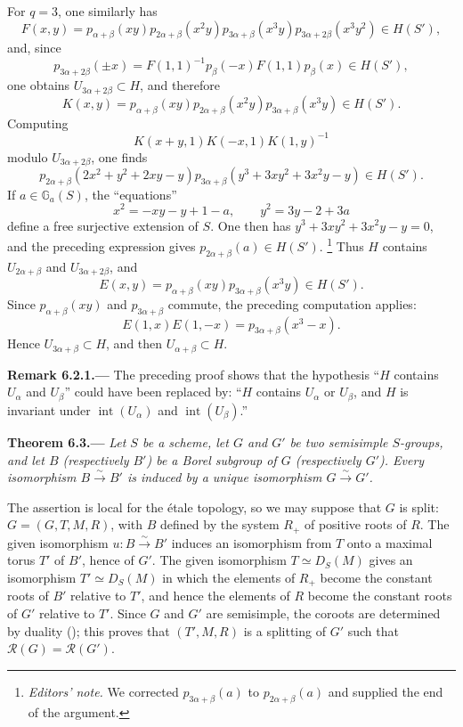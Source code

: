 For \(q=3\), one similarly has
\[
 F(x,y)=
 p_{\alpha+\beta}(xy)
 p_{2\alpha+\beta}(x^2y)
 p_{3\alpha+\beta}(x^3y)
 p_{3\alpha+2\beta}(x^3y^2)\in H(S'),
\]
and, since
\[
 p_{3\alpha+2\beta}(\pm x)
 =F(1,1)^{-1}p_\beta(-x)F(1,1)p_\beta(x)\in H(S'),
\]
one obtains \(U_{3\alpha+2\beta}\subset H\), and therefore
\[
 K(x,y)=
 p_{\alpha+\beta}(xy)
 p_{2\alpha+\beta}(x^2y)
 p_{3\alpha+\beta}(x^3y)\in H(S').
\]
Computing
\[
 K(x+y,1)K(-x,1)K(1,y)^{-1}
\]
modulo \(U_{3\alpha+2\beta}\), one finds
\[
 p_{2\alpha+\beta}(2x^2+y^2+2xy-y)
 p_{3\alpha+\beta}(y^3+3xy^2+3x^2y-y)\in H(S').
\]
If \(a\in\mathbb G_a(S)\), the ``equations''
\[
  x^2=-xy-y+1-a,\qquad
  y^2=3y-2+3a
\]
define a free surjective extension of \(S\).  One then has
\(y^3+3xy^2+3x^2y-y=0\), and the preceding expression gives
\(p_{2\alpha+\beta}(a)\in H(S')\).
\footnote{\textit{Editors' note.} We corrected
\(p_{3\alpha+\beta}(a)\) to \(p_{2\alpha+\beta}(a)\) and supplied the
end of the argument.}
Thus \(H\) contains \(U_{2\alpha+\beta}\) and
\(U_{3\alpha+2\beta}\), and
\[
 E(x,y)=p_{\alpha+\beta}(xy)p_{3\alpha+\beta}(x^3y)\in H(S').
\]
Since \(p_{\alpha+\beta}(xy)\) and \(p_{3\alpha+\beta}\) commute, the
preceding computation applies:
\[
 E(1,x)E(1,-x)=p_{3\alpha+\beta}(x^3-x).
\]
Hence \(U_{3\alpha+\beta}\subset H\), and then
\(U_{\alpha+\beta}\subset H\).

\par\medskip\noindent{}\textbf{Remark 6.2.1.---}\enspace
The preceding proof shows that the hypothesis
``\(H\) contains \(U_\alpha\) and \(U_\beta\)'' could have been
replaced by: ``\(H\) contains \(U_\alpha\) or \(U_\beta\), and \(H\)
is invariant under \(\operatorname{int}(U_\alpha)\) and
\(\operatorname{int}(U_\beta)\).''

\par\medskip\noindent{}\textbf{Theorem 6.3.---}\enspace
\emph{Let \(S\) be a scheme, let \(G\) and \(G'\) be two semisimple
\(S\)-groups, and let \(B\) (respectively \(B'\)) be a Borel subgroup
of \(G\) (respectively \(G'\)).  Every isomorphism
\(B\xrightarrow{\sim}B'\) is induced by a unique isomorphism
\(G\xrightarrow{\sim}G'\).}

The assertion is local for the étale topology, so we may suppose that
\(G\) is split: \(G=(G,T,M,R)\), with \(B\) defined by the system
\(R_+\) of positive roots of \(R\).  The given isomorphism
\(u:B\xrightarrow{\sim}B'\) induces an isomorphism from \(T\) onto a
maximal torus \(T'\) of \(B'\), hence of \(G'\).  The given
isomorphism \(T\simeq D_S(M)\) gives an isomorphism
\(T'\simeq D_S(M)\) in which the elements of \(R_+\) become the
constant roots of \(B'\) relative to \(T'\), and hence the elements of
\(R\) become the constant roots of \(G'\) relative to \(T'\).  Since
\(G\) and \(G'\) are semisimple, the coroots are determined by duality
(); this proves that \((T',M,R)\) is a splitting of
\(G'\) such that \(\mathscr R(G)=\mathscr R(G')\).

